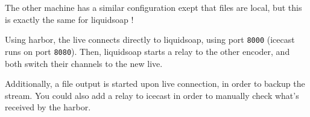 The other machine has a similar configuration exept that files are local, but this is exactly the same for liquidsoap !

Using harbor, the live connects directly to liquidsoap, using port \verb+8000+ (icecast runs on port \verb+8080+). 
Then, liquidsoap starts a relay to the other encoder, and both switch their channels to the new live.

Additionally, a file output is started upon live connection, in order to backup the stream. You could also add a relay to 
icecast in order to manually check what's received by the harbor.

